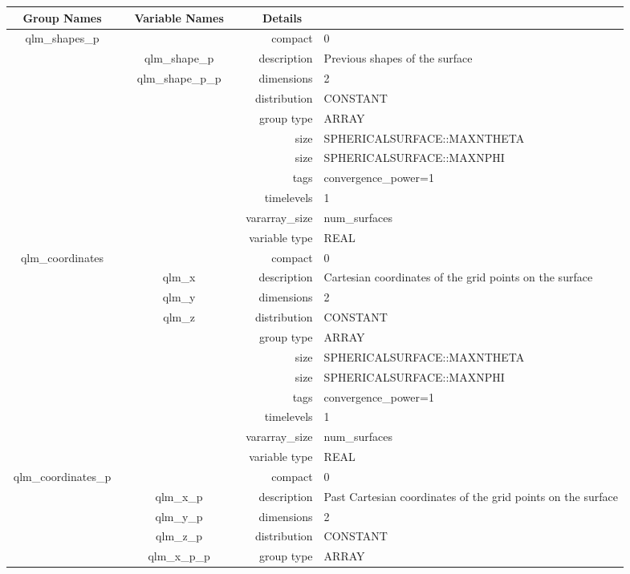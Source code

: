 \vspace{5mm}
\vspace{5mm}

\begin{tabular*}{150mm}{|c|c@{\extracolsep{\fill}}|rl|} \hline 
~ {\bf Group Names} ~ & ~ {\bf Variable Names} ~  &{\bf Details} ~ & ~ \\ 
\hline 
qlm\_shapes\_p &  & compact & 0 \\ 
 & qlm\_shape\_p & description & Previous shapes of the surface \\ 
 & qlm\_shape\_p\_p & dimensions & 2 \\ 
 &  & distribution & CONSTANT \\ 
 &  & group type & ARRAY \\ 
 &  & size & SPHERICALSURFACE::MAXNTHETA \\ 
& ~ & size & SPHERICALSURFACE::MAXNPHI \\ 
 &  & tags & convergence\_power=1 \\ 
 &  & timelevels & 1 \\ 
 &  & vararray\_size & num\_surfaces \\ 
 &  & variable type & REAL \\ 
\hline 
qlm\_coordinates &  & compact & 0 \\ 
 & qlm\_x & description & Cartesian coordinates of the grid points on the surface \\ 
 & qlm\_y & dimensions & 2 \\ 
 & qlm\_z & distribution & CONSTANT \\ 
 &  & group type & ARRAY \\ 
 &  & size & SPHERICALSURFACE::MAXNTHETA \\ 
& ~ & size & SPHERICALSURFACE::MAXNPHI \\ 
 &  & tags & convergence\_power=1 \\ 
 &  & timelevels & 1 \\ 
 &  & vararray\_size & num\_surfaces \\ 
 &  & variable type & REAL \\ 
\hline 
qlm\_coordinates\_p &  & compact & 0 \\ 
 & qlm\_x\_p & description & Past Cartesian coordinates of the grid points on the surface \\ 
 & qlm\_y\_p & dimensions & 2 \\ 
 & qlm\_z\_p & distribution & CONSTANT \\ 
 & qlm\_x\_p\_p & group type & ARRAY \\ 

\end{tabular*}
